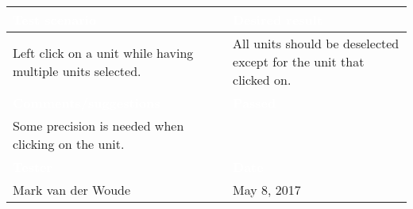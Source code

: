 \begin{tabularx}{\textwidth}{|X|X|}
\hline
\rowcolor{lightgray}\textcolor{white}{\textbf{Test scenario}} &
\textcolor{white}{\textbf{Desired result}}       
\\\hline
Left click on a unit while having multiple units selected. & All units should be deselected except for the unit that clicked on.  
\\\hline
\rowcolor{lightgray}\textcolor{white}{\textbf{Comments/suggestions}} & 
\textcolor{white}{\textbf{Passed}}
\\\hline
Some precision is needed when clicking on the unit. & \cellcolor{green}                      
\\\hline
\rowcolor{lightgray}\textcolor{white}{\textbf{Tester}} & \cellcolor{lightgray}\textcolor{white}{\textbf{Date}}               
\\\hline
Mark van der Woude & May 8, 2017                               		 
\\\hline
\end{tabularx}